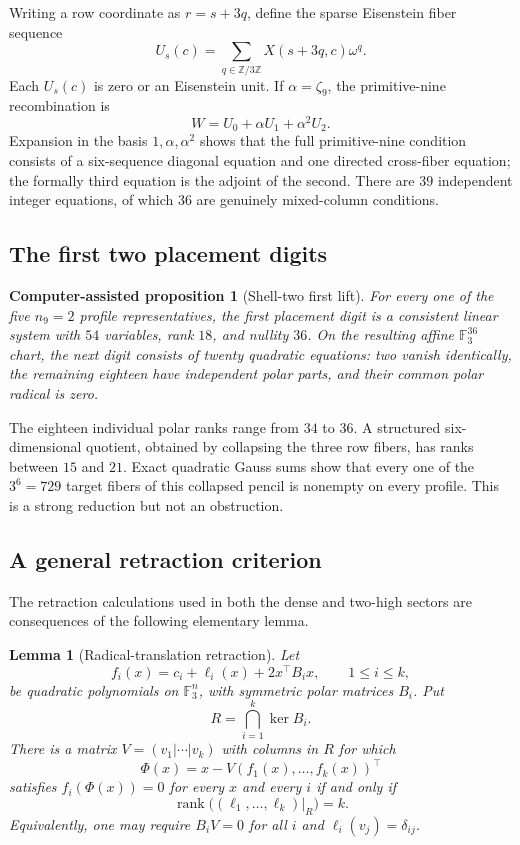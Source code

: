 \documentclass[11pt]{article}
\newtheorem{lemma}[theorem]{Lemma}
\newtheorem{computationalproposition}[theorem]{Computer-assisted proposition}
\theoremstyle{remark}
\newcommand{\F}{\mathbb F}
\newcommand{\Z}{\mathbb Z}
\newcommand{\rank}{\operatorname{rank}}
\begin{document}
Writing a row coordinate as $r=s+3q$, define the sparse Eisenstein fiber
sequence
\[
 U_s(c)=\sum_{q\in\Z/3\Z}X(s+3q,c)\omega^q.
\]
Each $U_s(c)$ is zero or an Eisenstein unit.  If $\alpha=\zeta_9$, the
primitive-nine recombination is
\begin{equation}
 W=U_0+\alpha U_1+\alpha^2U_2.
 \label{eq:W}
\end{equation}
Expansion in the basis $1,\alpha,\alpha^2$ shows that the full
primitive-nine condition consists of a six-sequence diagonal equation and
one directed cross-fiber equation; the formally third equation is the
adjoint of the second.  There are $39$ independent integer equations, of
which $36$ are genuinely mixed-column conditions.

\subsection{The first two placement digits}

\begin{computationalproposition}[Shell-two first lift]
\label{prop:firstlift}
For every one of the five $n_9=2$ profile representatives, the first
placement digit is a consistent linear system with $54$ variables, rank
$18$, and nullity $36$.  On the resulting affine $\F_3^{36}$ chart, the
next digit consists of twenty quadratic equations: two vanish identically,
the remaining eighteen have independent polar parts, and their common
polar radical is zero.
\end{computationalproposition}

The eighteen individual polar ranks range from $34$ to $36$.  A structured
six-dimensional quotient, obtained by collapsing the three row fibers, has
ranks between $15$ and $21$.  Exact quadratic Gauss sums show that every one
of the $3^6=729$ target fibers of this collapsed pencil is nonempty on every
profile.  This is a strong reduction but not an obstruction.

\subsection{A general retraction criterion}

The retraction calculations used in both the dense and two-high sectors
are consequences of the following elementary lemma.

\begin{lemma}[Radical-translation retraction]
\label{lem:retraction}
Let
\[
 f_i(x)=c_i+\ell_i(x)+2x^\top B_ix,\qquad 1\leq i\leq k,
\]
be quadratic polynomials on $\F_3^n$, with symmetric polar matrices $B_i$.
Put
\[
 R=\bigcap_{i=1}^k\ker B_i.
\]
There is a matrix $V=(v_1|\cdots|v_k)$ with columns in $R$ for which
\[
 \Phi(x)=x-V(f_1(x),\ldots,f_k(x))^\top
\]
satisfies $f_i(\Phi(x))=0$ for every $x$ and every $i$ if and only if
\[
 \rank\bigl((\ell_1,\ldots,\ell_k)|_R\bigr)=k.
\]
Equivalently, one may require $B_iV=0$ for all $i$ and
$\ell_i(v_j)=\delta_{ij}$.
\end{lemma}
\end{document}
